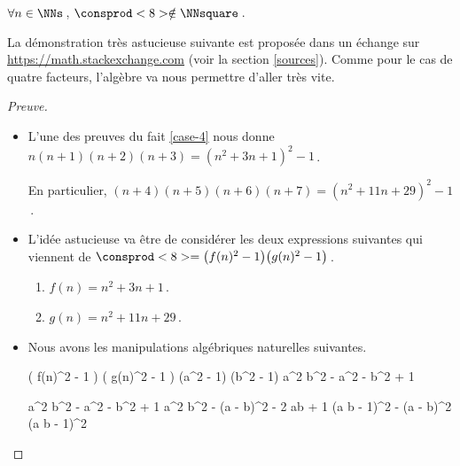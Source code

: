 \begin{fact} \label{case-8}
	 $\forall n \in \NNs$\,, $\consprod<8> \notin \NNsquare$\,.
\end{fact}




La démonstration très astucieuse suivante est proposée dans un échange sur \url{https://math.stackexchange.com} (voir la section \ref{sources}).
Comme pour le cas de quatre facteurs, l'algèbre va nous permettre d'aller très vite.


\begin{proof}[Preuve]
	\leavevmode

	\begin{itemize}
		\item L'une des preuves du fait \ref{case-4} nous donne
		$n (n + 1) (n + 2) (n + 3) = (n^2 + 3n + 1)^2 - 1$\,.

		\smallskip
		\noindent
		En particulier,
		$(n + 4)(n + 5)(n + 6)(n + 7) = (n^2 + 11 n + 29)^2 - 1$\,.


		\item L'idée astucieuse va être de considérer les deux expressions suivantes qui viennent de $\consprod<8> = \big( f(n)^2 - 1 \big) \big( g(n)^2 - 1 \big)$\,.
		\begin{enumerate}
			\item $f(n) = n^2 + 3n + 1$\,.

			\item $g(n) = n^2 + 11 n + 29$\,.
		\end{enumerate}


		\item Nous avons les manipulations algébriques naturelles suivantes.

        \noindent\kern-6pt%
        \begin{stepcalc}[style = sar]
        \explnext{}
        	\big( f(n)^2 - 1 \big) \big( g(n)^2 - 1 \big)
        	(a^2 - 1) (b^2 - 1)
        \explnext{}
        	a^2 b^2 - a^2 - b^2 + 1
        \end{stepcalc}

		\newpage  
        \noindent\kern-6pt%
        \begin{stepcalc}[style = sar]
        \explnext{}
        	a^2 b^2 - a^2 - b^2 + 1
        	a^2 b^2 - (a - b)^2 - 2 ab + 1
        \explnext{}
        	(a b  - 1)^2 - (a - b)^2
        	(a b  - 1)^2
        \end{stepcalc}
        

\end{itemize}
\end{proof}
